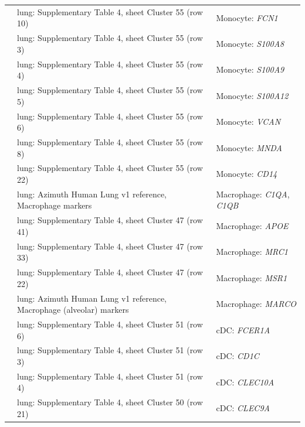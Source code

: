 \begin{longtable}{@{}>{\raggedright\arraybackslash}p{2.0cm} >{\raggedright\arraybackslash}p{4.6cm} >{\raggedright\arraybackslash}p{8.4cm}@{}}
\cite{travagliniMolecularCellAtlas2020} & lung: Supplementary Table 4, sheet Cluster 55 (row 10) & Monocyte: \textit{FCN1} \\
\cite{travagliniMolecularCellAtlas2020} & lung: Supplementary Table 4, sheet Cluster 55 (row 3) & Monocyte: \textit{S100A8} \\
\cite{travagliniMolecularCellAtlas2020} & lung: Supplementary Table 4, sheet Cluster 55 (row 4) & Monocyte: \textit{S100A9} \\
\cite{travagliniMolecularCellAtlas2020} & lung: Supplementary Table 4, sheet Cluster 55 (row 5) & Monocyte: \textit{S100A12} \\
\cite{travagliniMolecularCellAtlas2020} & lung: Supplementary Table 4, sheet Cluster 55 (row 6) & Monocyte: \textit{VCAN} \\
\cite{travagliniMolecularCellAtlas2020} & lung: Supplementary Table 4, sheet Cluster 55 (row 8) & Monocyte: \textit{MNDA} \\
\cite{travagliniMolecularCellAtlas2020} & lung: Supplementary Table 4, sheet Cluster 55 (row 22) & Monocyte: \textit{CD14} \\
\cite{travagliniMolecularCellAtlas2020} & lung: Azimuth Human Lung v1 reference, Macrophage markers & Macrophage: \textit{C1QA}, \textit{C1QB} \\
\cite{travagliniMolecularCellAtlas2020} & lung: Supplementary Table 4, sheet Cluster 47 (row 41) & Macrophage: \textit{APOE} \\
\cite{travagliniMolecularCellAtlas2020} & lung: Supplementary Table 4, sheet Cluster 47 (row 33) & Macrophage: \textit{MRC1} \\
\cite{travagliniMolecularCellAtlas2020} & lung: Supplementary Table 4, sheet Cluster 47 (row 22) & Macrophage: \textit{MSR1} \\
\cite{travagliniMolecularCellAtlas2020} & lung: Azimuth Human Lung v1 reference, Macrophage (alveolar) markers & Macrophage: \textit{MARCO} \\
\cite{travagliniMolecularCellAtlas2020} & lung: Supplementary Table 4, sheet Cluster 51 (row 6) & cDC: \textit{FCER1A} \\
\cite{travagliniMolecularCellAtlas2020} & lung: Supplementary Table 4, sheet Cluster 51 (row 3) & cDC: \textit{CD1C} \\
\cite{travagliniMolecularCellAtlas2020} & lung: Supplementary Table 4, sheet Cluster 51 (row 4) & cDC: \textit{CLEC10A} \\
\cite{travagliniMolecularCellAtlas2020} & lung: Supplementary Table 4, sheet Cluster 50 (row 21) & cDC: \textit{CLEC9A} \\

\end{longtable}
